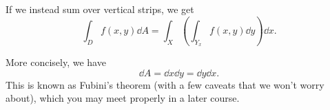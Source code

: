 \documentclass[a4paper]{scrartcl}
\begin{document}
\begin{center}

\end{center}

If we instead sum over vertical strips, we get 
$$
	\int_D f(x, y) \dd A = \int_X \left(\int_{Y_x} f(x, y) \dd y\right) \dd x.
$$

More concisely, we have
$$
\dd A = \dd x \dd y = \dd y \dd x. 
$$
This is known as Fubini's theorem (with a few caveats that we won't worry about), which you may meet properly in a later course.
\end{document}
